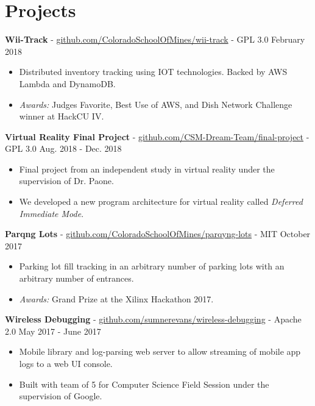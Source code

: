 \documentclass[10pt,letterpaper]{article}
\begin{document}
\section*{Projects}
\textbf{Wii-Track} -
\href{https://github.com/ColoradoSchoolOfMines/wii-track}{github.com/ColoradoSchoolOfMines/wii-track}
- GPL 3.0 \hfill February 2018
\begin{itemize}
    \item Distributed inventory tracking using IOT technologies. Backed by AWS
        Lambda and DynamoDB.
    \item \textit{Awards:} Judges Favorite, Best Use of AWS, and Dish Network
        Challenge winner at HackCU IV.
\end{itemize}


\textbf{Virtual Reality Final Project} -
\href{https://github.com/CSM-Dream-Team/final-project}{github.com/CSM-Dream-Team/final-project}
- GPL 3.0 \hfill Aug. 2018 - Dec. 2018
\begin{itemize}
    \item Final project from an independent study in virtual reality under the
        supervision of Dr. Paone.
    \item We developed a new program architecture for virtual reality called
        \textit{Deferred Immediate Mode}.
\end{itemize}

\textbf{Parqng Lots} -
\href{https://github.com/ColoradoSchoolOfMines/parqyng-lots}{github.com/ColoradoSchoolOfMines/parqyng-lots}
- MIT \hfill October 2017
\begin{itemize}
    \item Parking lot fill tracking in an arbitrary number of parking lots with
        an arbitrary number of entrances.
    \item \textit{Awards:} Grand Prize at the Xilinx Hackathon 2017.
\end{itemize}

\textbf{Wireless Debugging} -
\href{https://github.com/sumnerevans/wireless-debugging}{github.com/sumnerevans/wireless-debugging}
- Apache 2.0 \hfill May 2017 - June 2017
\begin{itemize}
    \item Mobile library and log-parsing web server to allow streaming of mobile app
        logs to a web UI console.
    \item Built with team of 5 for Computer Science Field Session under the
        supervision of Google.
\end{itemize}
\end{document}
